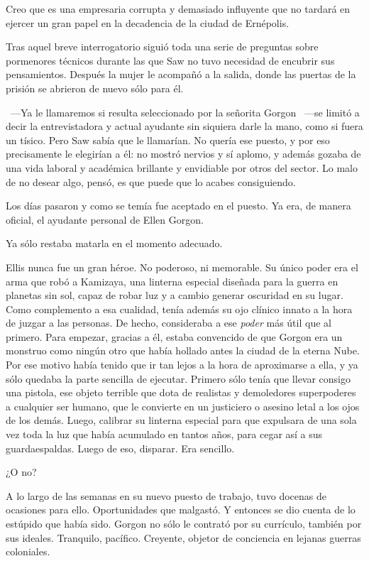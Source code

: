 Creo que es una empresaria corrupta y demasiado influyente que no tardará en ejercer un gran papel en la decadencia de la ciudad de Ernépolis.

Tras aquel breve interrogatorio siguió toda una serie de preguntas sobre pormenores técnicos durante las que Saw no tuvo necesidad de encubrir sus pensamientos. Después la mujer le acompañó a la salida, donde las puertas de la prisión se abrieron de nuevo sólo para él.

~---Ya le llamaremos si resulta seleccionado por la señorita Gorgon ~---se limitó a decir la entrevistadora y actual ayudante sin siquiera darle la mano, como si fuera un tísico. Pero Saw sabía que le llamarían. No quería ese puesto, y por eso precisamente le elegirían a él: no mostró nervios y sí aplomo, y además gozaba de una vida laboral y académica brillante y envidiable por otros del sector. Lo malo de no desear algo, pensó, es que puede que lo acabes consiguiendo.

Los días pasaron y como se temía fue aceptado en el puesto. Ya era, de manera oficial, el ayudante personal de Ellen Gorgon.

Ya sólo restaba matarla en el momento adecuado.

Ellis nunca fue un gran héroe. No poderoso, ni memorable. Su único poder era el arma que robó a Kamizaya, una linterna especial diseñada para la guerra en planetas sin sol, capaz de robar luz y a cambio generar oscuridad en su lugar. Como complemento a esa cualidad, tenía además su ojo clínico innato a la hora de juzgar a las personas. De hecho, consideraba a ese \emph{poder} más útil que al primero. Para empezar, gracias a él, estaba convencido de que Gorgon era un monstruo como ningún otro que había hollado antes la ciudad de la eterna Nube. Por ese motivo había tenido que ir tan lejos a la hora de aproximarse a ella, y ya sólo quedaba la parte sencilla de ejecutar. Primero sólo tenía que llevar consigo una pistola, ese objeto terrible que dota de realistas y demoledores superpoderes a cualquier ser humano, que le convierte en un justiciero o asesino letal a los ojos de los demás. Luego, calibrar su linterna especial para que expulsara de una sola vez toda la luz que había acumulado en tantos años, para cegar así a sus guardaespaldas. Luego de eso, disparar. Era sencillo.

¿O no?

A lo largo de las semanas en su nuevo puesto de trabajo, tuvo docenas de ocasiones para ello. Oportunidades que malgastó. Y entonces se dio cuenta de lo estúpido que había sido. Gorgon no sólo le contrató por su currículo, también por sus ideales. Tranquilo, pacífico. Creyente, objetor de conciencia en lejanas guerras coloniales.


